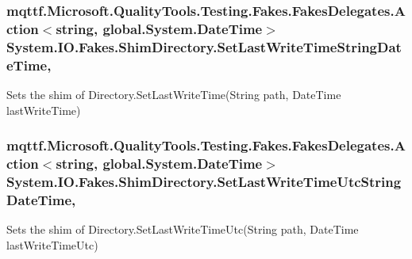 \hypertarget{class_system_1_1_i_o_1_1_fakes_1_1_shim_directory_a407fbf4015a7f0dd73ecb6055c2c6ec7}{
\subsubsection[{Set\-Last\-Write\-Time\-String\-Date\-Time}]{\setlength{\rightskip}{0pt plus 5cm}mqttf.\-Microsoft.\-Quality\-Tools.\-Testing.\-Fakes.\-Fakes\-Delegates.\-Action$<$string, global.\-System.\-Date\-Time$>$ System.\-I\-O.\-Fakes.\-Shim\-Directory.\-Set\-Last\-Write\-Time\-String\-Date\-Time\hspace{0.3cm}{\ttfamily [static]}, {\ttfamily [set]}}}\label{class_system_1_1_i_o_1_1_fakes_1_1_shim_directory_a407fbf4015a7f0dd73ecb6055c2c6ec7}


Sets the shim of Directory.\-Set\-Last\-Write\-Time(\-String path, Date\-Time last\-Write\-Time)

\hypertarget{class_system_1_1_i_o_1_1_fakes_1_1_shim_directory_a208b21e3f46a2f2d7f1c4877b835f039}{
\subsubsection[{Set\-Last\-Write\-Time\-Utc\-String\-Date\-Time}]{\setlength{\rightskip}{0pt plus 5cm}mqttf.\-Microsoft.\-Quality\-Tools.\-Testing.\-Fakes.\-Fakes\-Delegates.\-Action$<$string, global.\-System.\-Date\-Time$>$ System.\-I\-O.\-Fakes.\-Shim\-Directory.\-Set\-Last\-Write\-Time\-Utc\-String\-Date\-Time\hspace{0.3cm}{\ttfamily [static]}, {\ttfamily [set]}}}\label{class_system_1_1_i_o_1_1_fakes_1_1_shim_directory_a208b21e3f46a2f2d7f1c4877b835f039}


Sets the shim of Directory.\-Set\-Last\-Write\-Time\-Utc(\-String path, Date\-Time last\-Write\-Time\-Utc)

